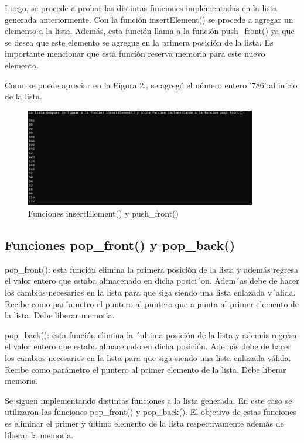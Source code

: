\documentclass[12pt,a4paper]{article}
\begin{document}
Luego, se procede a probar las distintas funciones implementadas en la lista generada anteriormente. Con la función insertElement() se procede a agregar un elemento a la lista. Además, esta función llama a la función push\_front() ya que se desea que este elemento se agregue en la primera posición de la lista. Es importante mencionar que esta función reserva memoria para este nuevo elemento.

Como se puede apreciar en la Figura 2., se agregó el número entero '786' al inicio de la lista.

\begin{figure}[H]
    \centering
    \center
    \includegraphics[width=0.9\textwidth]{FotosLabo7/Figura2.png}
    \caption{Funciones insertElement() y push\_front() \cite{cap}}
    \label{fig:writeList}
\end{figure}

\subsection{Funciones pop\_front() y pop\_back()}

pop\_front(): esta función elimina la primera posición de la lista y además regresa el valor entero que estaba almacenado en dicha posici´on. Adem´as debe de hacer los cambios necesarios en la lista para que siga siendo una lista enlazada v´alida. Recibe como par´ametro el puntero al puntero que a punta al primer elemento de la lista. Debe liberar memoria.

pop\_back(): esta función elimina la ´ultima posición de la lista y además regresa el valor entero que estaba almacenado en dicha posición. Además debe de hacer los cambios necesarios en la lista para que siga siendo una lista enlazada válida. Recibe como parámetro el puntero al primer elemento de la lista. Debe liberar memoria.

Se siguen implementando distintas funciones a la lista generada. En este caso se utilizaron las funciones pop\_front() y pop\_back(). El objetivo de estas funciones es eliminar el primer y último elemento de la lista respectivamente además de liberar la memoria.
\end{document}
